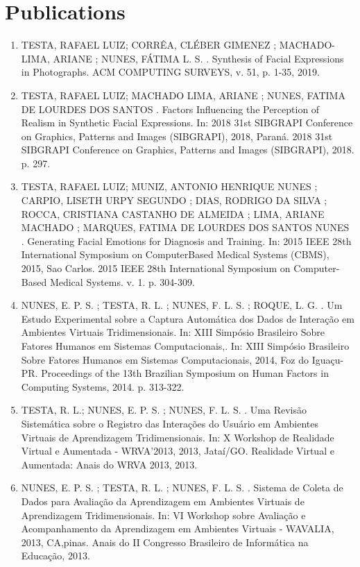 \documentclass[11pt,a4paper,sans]{moderncv} %
\begin{document}
\section{Publications}
\begin{enumerate}
    \item TESTA, RAFAEL LUIZ; CORRÊA, CLÉBER GIMENEZ ; MACHADO-LIMA, ARIANE ; NUNES, FÁTIMA L. S. . Synthesis of Facial Expressions in Photographs. ACM COMPUTING SURVEYS, v. 51, p. 1-35, 2019.
    \item  TESTA, RAFAEL LUIZ; MACHADO LIMA, ARIANE ; NUNES, FATIMA DE LOURDES DOS SANTOS . Factors Influencing the Perception of Realism in Synthetic Facial Expressions. In: 2018 31st SIBGRAPI Conference on Graphics, Patterns and Images (SIBGRAPI), 2018, Paraná. 2018 31st SIBGRAPI Conference on Graphics, Patterns and Images (SIBGRAPI), 2018. p. 297.
    \item  TESTA, RAFAEL LUIZ; MUNIZ, ANTONIO HENRIQUE NUNES ; CARPIO, LISETH URPY SEGUNDO ; DIAS, RODRIGO DA SILVA ; ROCCA, CRISTIANA CASTANHO DE ALMEIDA ; LIMA, ARIANE MACHADO ; MARQUES, FATIMA DE LOURDES DOS SANTOS NUNES . Generating Facial Emotions for Diagnosis and Training. In: 2015 IEEE 28th International Symposium on ComputerBased Medical Systems (CBMS), 2015, Sao Carlos. 2015 IEEE 28th International Symposium on Computer-Based Medical Systems. v. 1. p. 304-309.
    \item  NUNES, E. P. S. ; TESTA, R. L. ; NUNES, F. L. S. ; ROQUE, L. G. . Um Estudo Experimental sobre a Captura Automática dos Dados de Interação em Ambientes Virtuais Tridimensionais. In: XIII Simpósio Brasileiro Sobre Fatores Humanos em Sistemas Computacionais,. In: XIII Simpósio Brasileiro Sobre Fatores Humanos em Sistemas Computacionais, 2014, Foz do Iguaçu-PR. Proceedings of the 13th Brazilian Symposium on Human Factors in Computing Systems, 2014. p. 313-322.
    \item  TESTA, R. L.; NUNES, E. P. S. ; NUNES, F. L. S. . Uma Revisão Sistemática sobre o Registro das Interações do Usuário em Ambientes Virtuais de Aprendizagem Tridimensionais. In: X Workshop de Realidade Virtual e Aumentada - WRVA'2013, 2013, Jataí/GO. Realidade Virtual e Aumentada: Anais do WRVA 2013, 2013.
    \item  NUNES, E. P. S. ; TESTA, R. L. ; NUNES, F. L. S. . Sistema de Coleta de Dados para Avaliação da Aprendizagem em Ambientes Virtuais de Aprendizagem Tridimensionais. In: VI Workshop sobre Avaliação e Acompanhamento da Aprendizagem em Ambientes Virtuais - WAVALIA, 2013, CA,pinas. Anais do II Congresso Brasileiro de Informática na Educação, 2013.

\end{enumerate}
\end{document}
